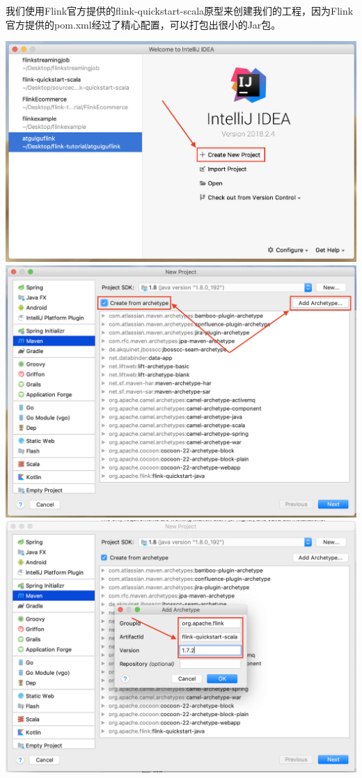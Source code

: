 \documentclass{ctexart}
\begin{document}
我们使用Flink官方提供的flink-quickstart-scala原型来创建我们的工程，因为Flink官方提供的pom.xml经过了精心配置，可以打包出很小的Jar包。

\includegraphics[width=\textwidth]{quickstart1.png}
\includegraphics[width=\textwidth]{quickstart2.png}
\includegraphics[width=\textwidth]{quickstart3.png}
\end{document}
